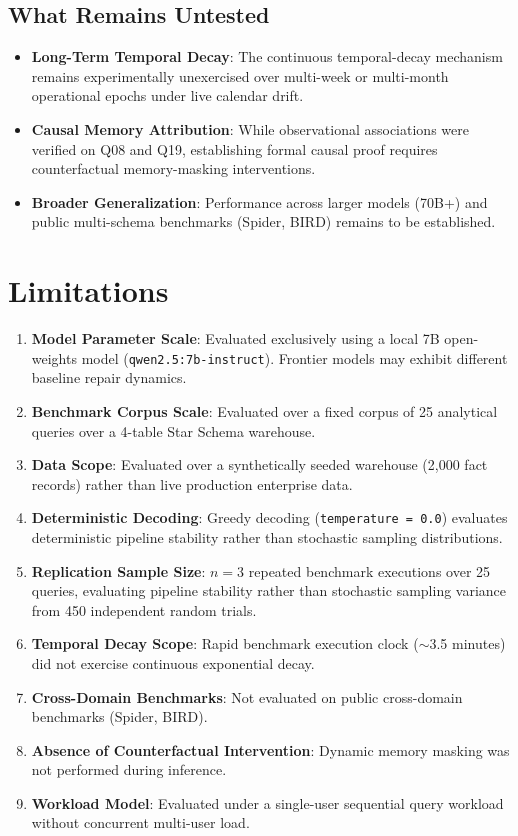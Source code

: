 \subsection{What Remains Untested}
\begin{itemize}
    \item \textbf{Long-Term Temporal Decay}: The continuous temporal-decay mechanism remains experimentally unexercised over multi-week or multi-month operational epochs under live calendar drift.
    \item \textbf{Causal Memory Attribution}: While observational associations were verified on Q08 and Q19, establishing formal causal proof requires counterfactual memory-masking interventions.
    \item \textbf{Broader Generalization}: Performance across larger models (70B+) and public multi-schema benchmarks (Spider, BIRD) remains to be established.
\end{itemize}

\section{Limitations}
\begin{enumerate}
    \item \textbf{Model Parameter Scale}: Evaluated exclusively using a local 7B open-weights model (\texttt{qwen2.5:7b-instruct}). Frontier models may exhibit different baseline repair dynamics.
    \item \textbf{Benchmark Corpus Scale}: Evaluated over a fixed corpus of 25 analytical queries over a 4-table Star Schema warehouse.
    \item \textbf{Data Scope}: Evaluated over a synthetically seeded warehouse (2,000 fact records) rather than live production enterprise data.
    \item \textbf{Deterministic Decoding}: Greedy decoding (\texttt{temperature = 0.0}) evaluates deterministic pipeline stability rather than stochastic sampling distributions.
    \item \textbf{Replication Sample Size}: $n = 3$ repeated benchmark executions over 25 queries, evaluating pipeline stability rather than stochastic sampling variance from 450 independent random trials.
    \item \textbf{Temporal Decay Scope}: Rapid benchmark execution clock ($\sim$3.5 minutes) did not exercise continuous exponential decay.
    \item \textbf{Cross-Domain Benchmarks}: Not evaluated on public cross-domain benchmarks (Spider, BIRD).
    \item \textbf{Absence of Counterfactual Intervention}: Dynamic memory masking was not performed during inference.
    \item \textbf{Workload Model}: Evaluated under a single-user sequential query workload without concurrent multi-user load.
\end{enumerate}

